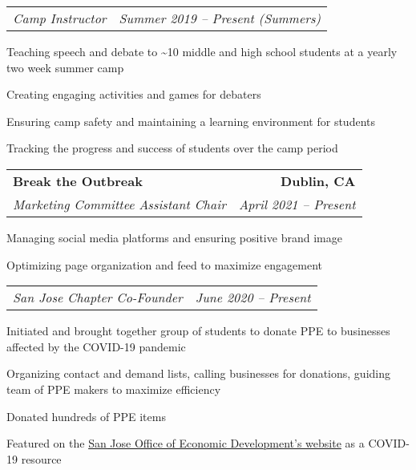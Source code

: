 \documentclass{article}
\newlength{\secskip}
\begin{document}
\goodbreak\vspace{\secskip}\par\noindent\begin{tabularx}{\linewidth}{Xr}
    \textit{Camp Instructor} & \textit{Summer 2019 -- Present (Summers)}\\
\end{tabularx}
\begin{compactitem}
    \item Teaching speech and debate to \textasciitilde{}10 middle and high school students at a yearly two week summer camp
    \item Creating engaging activities and games for debaters
    \item Ensuring camp safety and maintaining a learning environment for students
    \item Tracking the progress and success of students over the camp period
\end{compactitem}

\goodbreak\vspace{\secskip}\par\noindent\begin{tabularx}{\linewidth}{Xr}
    \textbf{Break the Outbreak} & \textbf{Dublin, CA}\\
    \textit{Marketing Committee Assistant Chair} & \textit{April 2021 -- Present}\\
\end{tabularx}
\begin{compactitem}
    \item Managing social media platforms and ensuring positive brand image
    \item Optimizing page organization and feed to maximize engagement
\end{compactitem}
\goodbreak\vspace{\secskip}\par\noindent\begin{tabularx}{\linewidth}{Xr}
    \textit{San Jose Chapter Co-Founder} & \textit{June 2020 -- Present}\\
\end{tabularx}
\begin{compactitem}
    \item Initiated and brought together group of students to donate PPE to businesses affected by the COVID-19 pandemic
    \item Organizing contact and demand lists, calling businesses for donations, guiding team of PPE makers to maximize efficiency
    \item Donated hundreds of PPE items
    \item Featured on the \href{https://www.sjeconomy.com/why-san-jose/covid-19-guidance/local-suppliers}{San Jose Office of Economic Development's website} as a COVID-19 resource
\end{compactitem}
\end{document}
